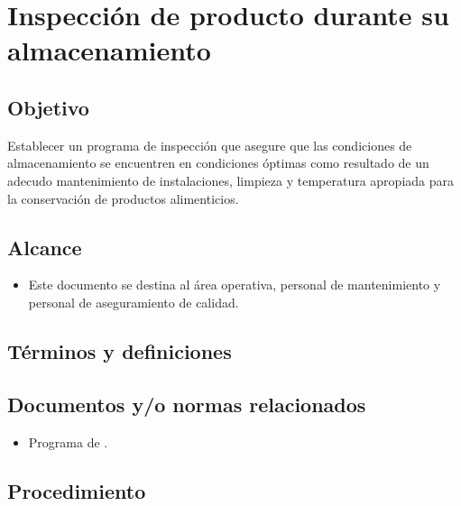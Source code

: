 \thispagestyle{formato-PI}
\renewcommand{\MayorVer}{2}
\renewcommand{\MenorVer}{1}
\renewcommand{\Codigo}{PSA-3-PRO}
\renewcommand{\FechaPub}{2023--01}
\renewcommand{\Titulo}{Inspección de producto durante su almacenamiento}

\section{\Titulo} \label{PRO:InspeccionDeAlimentosAlmacenados}

\subsection{Objetivo}
Establecer un programa de inspección que asegure que las condiciones de almacenamiento se encuentren en condiciones óptimas como resultado de un adecudo mantenimiento de instalaciones, limpieza y temperatura apropiada para la conservación de productos alimenticios.

\subsection{Alcance}
\begin{itemize}
	\item Este documento se destina al área operativa, personal de mantenimiento y personal de aseguramiento de calidad.
\end{itemize}

\subsection{Términos y definiciones}
\begin{description}
\end{description}

\subsection{Documentos y/o normas relacionados}
\begin{itemize}
	\item Programa de .
\end{itemize}

\subsection{Procedimiento} \label{sec:pro:inspeccionDeProducto:almacenamiento}
